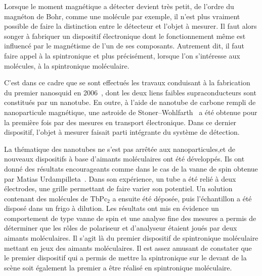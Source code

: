 Lorsque le moment magnétique a détecter devient très petit, de l'ordre du magnéton de Bohr, comme une molécule par exemple, il n'est plus vraiment possible de faire la distinction entre le détecteur et l'objet à mesurer. Il faut alors songer à fabriquer un dispositif électronique dont le fonctionnement même est influencé par le magnétisme de l'un de ses composants. Autrement dit, il faut faire appel à la spintronique et plus précisément, lorsque l'on s'intéresse aux molécules, à la spintronique moléculaire.

C'est dans ce cadre que se sont effectués les travaux conduisant à la fabrication du premier nanosquid en 2006~\cite{CleuziouJ.-P.2006}, dont les deux liens faibles supraconducteurs sont constitués par un nanotube. En outre, à l'aide de nanotube de carbone rempli de nanoparticule magnétique, une astroide de Stoner–Wohlfarth~\cite{Cleuziou2011} a été obtenue pour la première fois par des mesures en transport électronique. Dans ce dernier dispositif, l'objet à mesurer faisait parti intégrante du système de détection.

La thématique des nanotubes ne s'est pas arrêtée aux nanoparticules,et de nouveaux dispositifs à base d'aimants moléculaires ont été développés. Ils ont donné des résultats encourageants comme dans le cas de la vanne de spin obtenue par Matias Urdampilleta~\cite{Urdampilleta2011}. Dans son expérience, un tube a été relié à deux électrodes, une grille permettant de faire varier son potentiel. Un solution contenant des molécules de TbPc$_{2}$ a ensuite été déposée, puis l'échantillon a été disposé dans un frigo à dilution. Les résultats ont mis en évidence un comportement de type vanne de spin et une analyse fine des mesures a permis de déterminer que les rôles de polariseur et d'analyseur étaient joués par deux aimants moléculaires. Il s'agit là du premier dispositif de spintronique moléculaire mettant en jeux des aimants moléculaires. Il est assez amusant de constater que le premier dispositif qui a permis de mettre la spintronique sur le devant de la scène soit également la premier a être réalisé en spintronique moléculaire.

